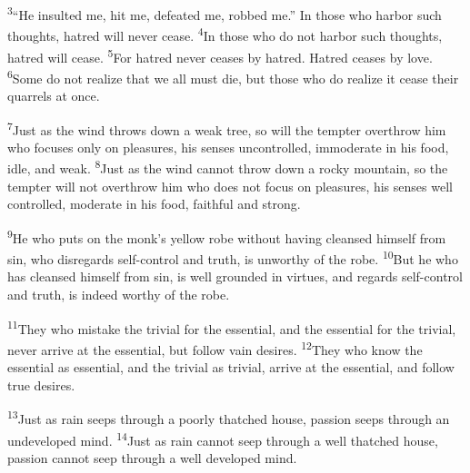 \documentclass[openany,12pt,english]{book}
\newenvironment{para}{\par\pretolerance=100\tolerance=200\setlength{\emergencystretch}{0.6em}\relax}{\par}
\begin{document}
\begin{para}
    \textsuperscript{3}\thinspace{}“He insulted me, hit me, defeated me, robbed me.” In those who har\-bor such thoughts, ha\-tred will nev\-er cease.
    \textsuperscript{4}\thinspace{}In those who do not har\-bor such thoughts, ha\-tred will cease.
    \textsuperscript{5}\thinspace{}For ha\-tred nev\-er ceases by ha\-tred. Ha\-tred ceases by love.
    \textsuperscript{6}\thinspace{}Some do not re\-al\-ize that we all must die, but those who do re\-al\-ize it cease their quarrels at once.
\end{para}

\begin{para}
    \textsuperscript{7}\thinspace{}Just as the wind throws down a weak tree, so will the temp\-ter over\-throw him who fo\-cus\-es on\-ly on pleasures, his sen\-ses un\-con\-trolled, im\-mod\-er\-ate in his food, i\-dle, and weak.
    \textsuperscript{8}\thinspace{}Just as the wind can\-not throw down a rock\-y moun\-tain, so the temp\-ter will not over\-throw him who does not fo\-cus on pleasures, his sen\-ses well con\-trolled, mod\-er\-ate in his food, faith\-ful and strong.
\end{para}

\begin{para}
    \textsuperscript{9}\thinspace{}He who puts on the monk's yel\-low robe with\-out hav\-ing cleansed him\-self from sin, who disregards self-control and truth, is un\-wor\-thy of the robe.
    \textsuperscript{10}\thinspace{}But he who has cleansed him\-self from sin, is well grounded in vir\-tues, and regards self-control and truth, is in\-deed wor\-thy of the robe.
\end{para}

\begin{para}
    \textsuperscript{11}\thinspace{}They who mis\-take the triv\-i\-al for the es\-sen\-tial, and the es\-sen\-tial for the triv\-i\-al, nev\-er ar\-rive at the es\-sen\-tial, but fol\-low vain desires.
    \textsuperscript{12}\thinspace{}They who know the es\-sen\-tial as es\-sen\-tial, and the triv\-i\-al as triv\-i\-al, ar\-rive at the es\-sen\-tial, and fol\-low true desires.
\end{para}

\begin{para}
    \textsuperscript{13}\thinspace{}Just as rain seeps through a poor\-ly tha\-tched house, pas\-sion seeps through an undeveloped mind.
    \textsuperscript{14}\thinspace{}Just as rain can\-not seep through a well tha\-tched house, pas\-sion can\-not seep through a well de\-vel\-oped mind.
\end{para}
\end{document}
